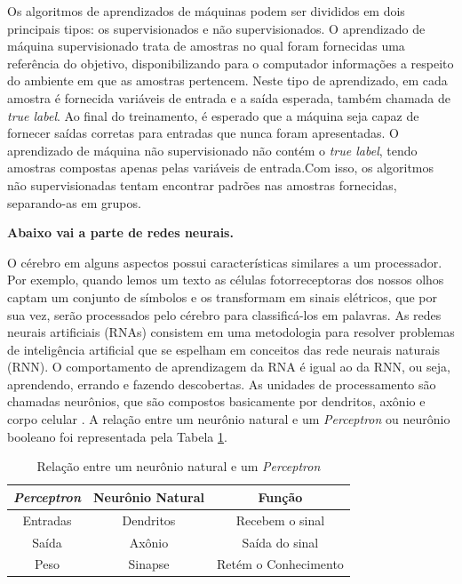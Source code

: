 \documentclass[conference]{IEEEtran}
\begin{document}
Os algoritmos de aprendizados de máquinas podem ser divididos em dois principais tipos: os supervisionados e não supervisionados. O aprendizado de máquina supervisionado trata de amostras no qual foram fornecidas uma referência do objetivo, disponibilizando para o computador informações a respeito do ambiente em que as amostras pertencem.\cite{marr2017} Neste tipo de aprendizado, em cada amostra é fornecida variáveis de entrada e a saída esperada, também chamada de \textit{true label}. Ao final do treinamento, é esperado que a máquina seja capaz de fornecer saídas corretas para entradas que nunca foram apresentadas. O aprendizado de máquina não supervisionado não contém o \textit{true label}, tendo amostras compostas apenas pelas variáveis de entrada.Com isso, os algoritmos não supervisionadas tentam encontrar padrões nas amostras fornecidas, separando-as em grupos.\cite{marr2017}

\textbf{Abaixo vai a parte de redes neurais.}

O cérebro em alguns aspectos possui características similares a um processador. Por exemplo, quando lemos um texto as células fotorreceptoras dos nossos olhos captam um conjunto de símbolos e os transformam em sinais elétricos, que por sua vez, serão processados pelo cérebro para classificá-los em palavras. As redes neurais artificiais (RNAs) consistem em uma metodologia para resolver problemas de inteligência artificial que se espelham em conceitos das rede neurais naturais (RNN). O comportamento de aprendizagem da RNA é igual ao da RNN, ou seja, aprendendo, errando e fazendo descobertas. As unidades de processamento são chamadas neurônios, que são compostos basicamente por dendritos, axônio e corpo celular \cite{kovacs96}. A relação entre um neurônio natural e um \textit{Perceptron} ou neurônio booleano foi representada pela Tabela \ref{table:tabelaComparativaNeuronioPerceptron}.

\renewcommand\tablename{TABELA}
\begin{table}[!h]
	\renewcommand{\arraystretch}{1.3}
	\caption{Relação entre um neurônio natural e um \textit{Perceptron}}
	\label{table:tabelaComparativaNeuronioPerceptron}
	\centering
	\begin{tabular}{|c|c|c|}
		\hline
		\textbf{\textit{Perceptron}} & \textbf{Neurônio Natural} & \textbf{Função}\\
		\hline
		Entradas & Dendritos & Recebem o sinal \\		
		\hline
		Saída & Axônio & Saída do sinal \\		
		\hline
		Peso & Sinapse & Retém o Conhecimento \\		
		\hline
	\end{tabular}
\end{table}
\end{document}
